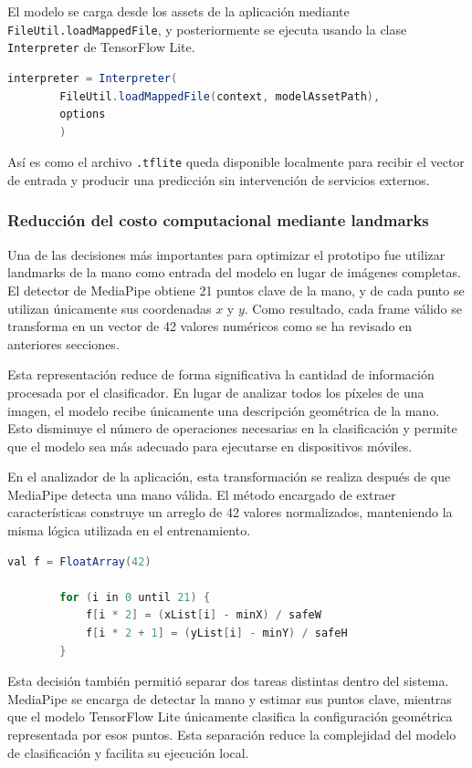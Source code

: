 	El modelo se carga desde los assets de la aplicación mediante \texttt{FileUtil.loadMappedFile}, y posteriormente se ejecuta usando la clase \texttt{Interpreter} de TensorFlow Lite.
	
	\begin{lstlisting}[language=Java]
		interpreter = Interpreter(
		FileUtil.loadMappedFile(context, modelAssetPath),
		options
		)
	\end{lstlisting}
	
	Así es como el archivo \texttt{.tflite} queda disponible localmente para recibir el vector de entrada y producir una predicción sin intervención de servicios externos.
	
	\subsubsection{Reducción del costo computacional mediante landmarks}
	
	Una de las decisiones más importantes para optimizar el prototipo fue utilizar landmarks de la mano como entrada del modelo en lugar de imágenes completas. El detector de MediaPipe obtiene 21 puntos clave de la mano, y de cada punto se utilizan únicamente sus coordenadas \(x\) y \(y\). Como resultado, cada frame válido se transforma en un vector de 42 valores numéricos como se ha revisado en anteriores secciones.
	
	Esta representación reduce de forma significativa la cantidad de información procesada por el clasificador. En lugar de analizar todos los píxeles de una imagen, el modelo recibe únicamente una descripción geométrica de la mano. Esto disminuye el número de operaciones necesarias en la clasificación y permite que el modelo sea más adecuado para ejecutarse en dispositivos móviles.
	
	En el analizador de la aplicación, esta transformación se realiza después de que MediaPipe detecta una mano válida. El método encargado de extraer características construye un arreglo de 42 valores normalizados, manteniendo la misma lógica utilizada en el entrenamiento.
	
	\begin{lstlisting}[language=Java]
		val f = FloatArray(42)
		
		for (i in 0 until 21) {
			f[i * 2] = (xList[i] - minX) / safeW
			f[i * 2 + 1] = (yList[i] - minY) / safeH
		}
	\end{lstlisting}
	
	Esta decisión también permitió separar dos tareas distintas dentro del sistema. MediaPipe se encarga de detectar la mano y estimar sus puntos clave, mientras que el modelo TensorFlow Lite únicamente clasifica la configuración geométrica representada por esos puntos. Esta separación reduce la complejidad del modelo de clasificación y facilita su ejecución local.
	
